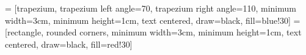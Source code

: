  = [trapezium, trapezium left angle=70, 
    trapezium right angle=110, minimum width=3cm, 
    minimum height=1cm, text centered, draw=black, fill=blue!30]
 = [rectangle, rounded corners, 
    minimum width=3cm, minimum height=1cm, text centered,
    draw=black, fill=red!30]
    
